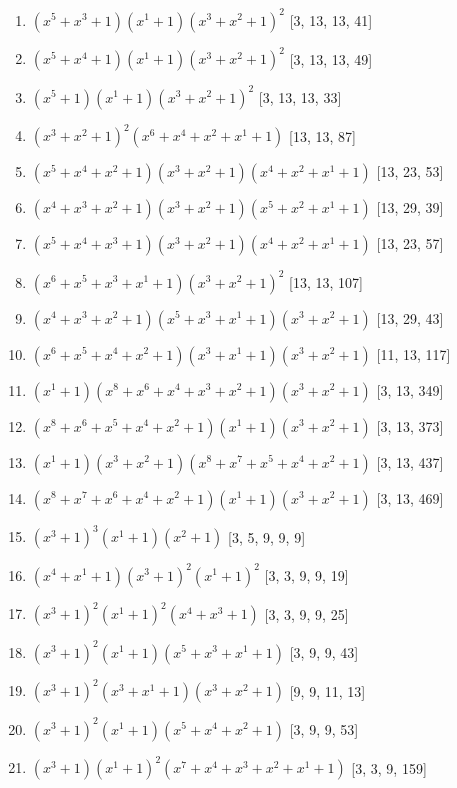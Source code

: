 \documentclass[10pt,twocolumn]{article}
\begin{document}
\begin{enumerate}
\item $(x^{5} + x^{3} + 1)(x^{1} + 1)(x^{3} + x^{2} + 1)^{2}$  [3, 13, 13, 41]
\item $(x^{5} + x^{4} + 1)(x^{1} + 1)(x^{3} + x^{2} + 1)^{2}$  [3, 13, 13, 49]
\item $(x^{5} + 1)(x^{1} + 1)(x^{3} + x^{2} + 1)^{2}$  [3, 13, 13, 33]
\item $(x^{3} + x^{2} + 1)^{2}(x^{6} + x^{4} + x^{2} + x^{1} + 1)$  [13, 13, 87]
\item $(x^{5} + x^{4} + x^{2} + 1)(x^{3} + x^{2} + 1)(x^{4} + x^{2} + x^{1} + 1)$  [13, 23, 53]
\item $(x^{4} + x^{3} + x^{2} + 1)(x^{3} + x^{2} + 1)(x^{5} + x^{2} + x^{1} + 1)$  [13, 29, 39]
\item $(x^{5} + x^{4} + x^{3} + 1)(x^{3} + x^{2} + 1)(x^{4} + x^{2} + x^{1} + 1)$  [13, 23, 57]
\item $(x^{6} + x^{5} + x^{3} + x^{1} + 1)(x^{3} + x^{2} + 1)^{2}$  [13, 13, 107]
\item $(x^{4} + x^{3} + x^{2} + 1)(x^{5} + x^{3} + x^{1} + 1)(x^{3} + x^{2} + 1)$  [13, 29, 43]
\item $(x^{6} + x^{5} + x^{4} + x^{2} + 1)(x^{3} + x^{1} + 1)(x^{3} + x^{2} + 1)$  [11, 13, 117]
\item $(x^{1} + 1)(x^{8} + x^{6} + x^{4} + x^{3} + x^{2} + 1)(x^{3} + x^{2} + 1)$  [3, 13, 349]
\item $(x^{8} + x^{6} + x^{5} + x^{4} + x^{2} + 1)(x^{1} + 1)(x^{3} + x^{2} + 1)$  [3, 13, 373]
\item $(x^{1} + 1)(x^{3} + x^{2} + 1)(x^{8} + x^{7} + x^{5} + x^{4} + x^{2} + 1)$  [3, 13, 437]
\item $(x^{8} + x^{7} + x^{6} + x^{4} + x^{2} + 1)(x^{1} + 1)(x^{3} + x^{2} + 1)$  [3, 13, 469]
\item $(x^{3} + 1)^{3}(x^{1} + 1)(x^{2} + 1)$  [3, 5, 9, 9, 9]
\item $(x^{4} + x^{1} + 1)(x^{3} + 1)^{2}(x^{1} + 1)^{2}$  [3, 3, 9, 9, 19]
\item $(x^{3} + 1)^{2}(x^{1} + 1)^{2}(x^{4} + x^{3} + 1)$  [3, 3, 9, 9, 25]
\item $(x^{3} + 1)^{2}(x^{1} + 1)(x^{5} + x^{3} + x^{1} + 1)$  [3, 9, 9, 43]
\item $(x^{3} + 1)^{2}(x^{3} + x^{1} + 1)(x^{3} + x^{2} + 1)$  [9, 9, 11, 13]
\item $(x^{3} + 1)^{2}(x^{1} + 1)(x^{5} + x^{4} + x^{2} + 1)$  [3, 9, 9, 53]
\item $(x^{3} + 1)(x^{1} + 1)^{2}(x^{7} + x^{4} + x^{3} + x^{2} + x^{1} + 1)$  [3, 3, 9, 159]

\end{enumerate}
\end{document}
